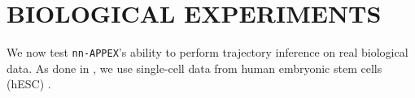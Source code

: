 \documentclass[twoside]{article}
\newcommand{\jkonetstar}{\texttt{JKOnet}$^\ast$}
\newcommand{\nappex}{\texttt{nn-APPEX}}
\begin{document}



\section{BIOLOGICAL EXPERIMENTS}
We now test \nappex's ability to perform trajectory inference on real biological data. As done in \citet{shen2025multi}, we use single-cell data from human embryonic stem cells (hESC) \citep{chu2016single}.
\end{document}
